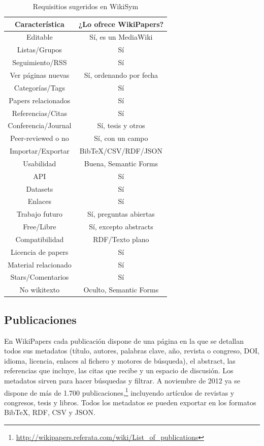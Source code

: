 \documentclass[11pt,onecolumn]{article}
\begin{document}
\begin{table}[htb]
\centering
\begin{tabular}{| c | c |}
\hline
\textbf{Característica} & \textbf{¿Lo ofrece WikiPapers?} \\
\hline
Editable & Sí, es un MediaWiki \\ \hline 
Listas/Grupos & Sí \\ \hline 
Seguimiento/RSS & Sí \\ \hline 
Ver páginas nuevas & Sí, ordenando por fecha \\ \hline 
Categorías/Tags & Sí \\ \hline 
Papers relacionados & Sí \\ \hline 
Referencias/Citas & Sí \\ \hline 
Conferencia/Journal & Sí, tesis y otros \\ \hline 
Peer-reviewed o no & Sí, con un campo \\ \hline 
Importar/Exportar & BibTeX/CSV/RDF/JSON \\ \hline 
Usabilidad & Buena, Semantic Forms \\ \hline 
API & Sí \\ \hline 
Datasets & Sí \\ \hline 
Enlaces & Sí \\ \hline 
Trabajo futuro & Sí, preguntas abiertas \\ \hline 
Free/Libre & Sí, excepto abstracts \\ \hline 
Compatibilidad & RDF/Texto plano \\ \hline 
Licencia de papers & Sí \\ \hline 
Material relacionado & Sí \\ \hline 
Stars/Comentarios & Sí \\ \hline 
No wikitexto & Oculto, Semantic Forms \\ \hline 
\end{tabular}
\caption{Requisitios sugeridos en WikiSym}
\label{tab:reqwikisym11}
\end{table}

\subsection{Publicaciones}
En WikiPapers cada publicación dispone de una página en la que se detallan todos sus metadatos (título, autores, palabras clave, año, revista o congreso, DOI, idioma, licencia, enlaces al fichero y motores de búsqueda), el abstract, las referencias que incluye, las citas que recibe y un espacio de discusión. Los metadatos sirven para hacer búsquedas y filtrar. A noviembre de 2012 ya se dispone de más de 1.700 publicaciones,\footnote{\href{http://wikipapers.referata.com/wiki/List_of_publications}{http://wikipapers.referata.com/wiki/List\_of\_publications}} incluyendo artículos de revistas y congresos, tesis y libros. Todos los metadatos se pueden exportar en los formatos BibTeX, RDF, CSV y JSON.
\end{document}
